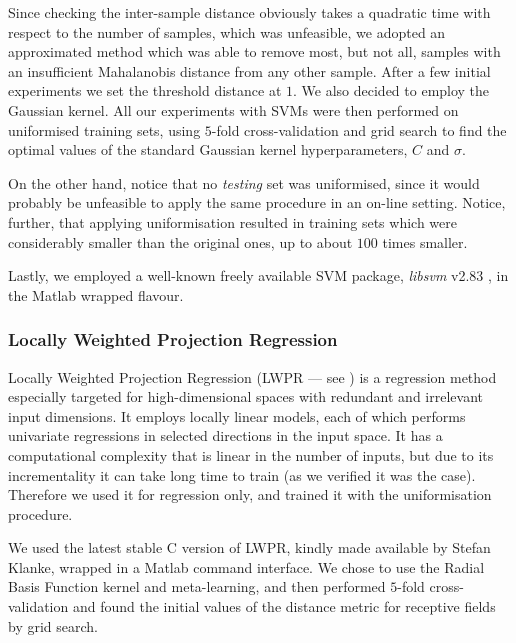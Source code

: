 Since checking the inter-sample distance obviously takes a quadratic
time with respect to the number of samples, which was unfeasible, we
adopted an approximated method which was able to remove most, but not
all, samples with an insufficient Mahalanobis distance from any other
sample. After a few initial experiments we set the threshold distance
at $1$. We also decided to employ the Gaussian kernel. All our
experiments with SVMs were then performed on uniformised training
sets, using $5$-fold cross-validation and grid search to find the
optimal values of the standard Gaussian kernel hyperparameters, $C$
and $\sigma$.

On the other hand, notice that no \emph{testing} set was uniformised,
since it would probably be unfeasible to apply the same procedure in
an on-line setting. Notice, further, that applying uniformisation
resulted in training sets which were considerably smaller than the
original ones, up to about $100$ times smaller.

Lastly, we employed a well-known freely available SVM package,
\emph{libsvm} v2.83 \cite{ChangL01}, in the Matlab wrapped flavour.

\subsubsection{Locally Weighted Projection Regression}

Locally Weighted Projection Regression (LWPR --- see \cite{lwpr}) is a
regression method especially targeted for high-dimensional
spaces with redundant and irrelevant input dimensions. It employs
locally linear models, each of which performs univariate regressions
in selected directions in the input space. It has a computational
complexity that is linear in the number of inputs, but due to its
incrementality it can take long time to train (as we verified it was
the case). Therefore we used it for regression only, and trained it
with the uniformisation procedure.

We used the latest stable C version of LWPR, kindly made available by
Stefan Klanke, wrapped in a Matlab command interface. We chose to use
the Radial Basis Function kernel and meta-learning, and then
performed $5$-fold cross-validation and found the initial values of
the distance metric for receptive fields by grid search.
